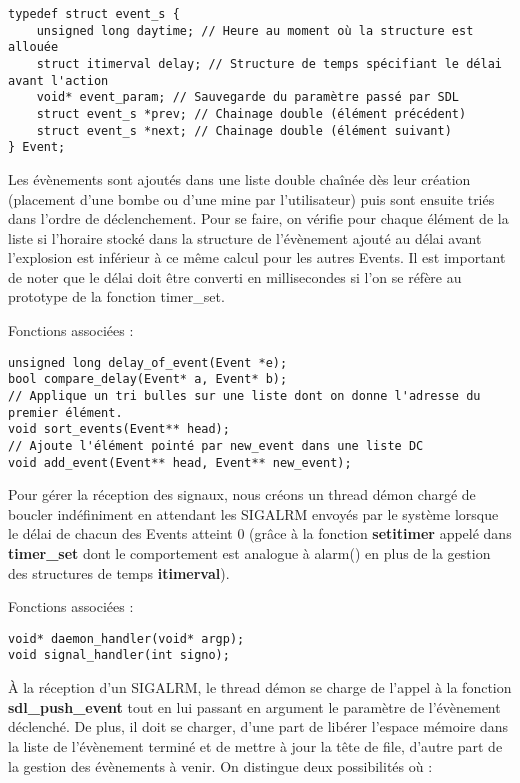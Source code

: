 \documentclass[a4paper]{article}
\begin{document}
\begin{verbatim}
typedef struct event_s {
    unsigned long daytime; // Heure au moment où la structure est allouée
    struct itimerval delay; // Structure de temps spécifiant le délai avant l'action
    void* event_param; // Sauvegarde du paramètre passé par SDL
    struct event_s *prev; // Chainage double (élément précédent)
    struct event_s *next; // Chainage double (élément suivant)
} Event;
\end{verbatim}

Les évènements sont ajoutés dans une liste double chaînée dès leur création (placement d'une bombe ou d'une mine par l'utilisateur) puis sont ensuite triés dans l'ordre de déclenchement. Pour se faire, on vérifie pour chaque élément de la liste si l'horaire stocké dans la structure de l'évènement ajouté au délai avant l'explosion est inférieur à ce même calcul pour les autres Events. Il est important de noter que le délai doit être converti en millisecondes si l'on se réfère au prototype de la fonction timer\_set.

Fonctions associées :
\begin{verbatim}
unsigned long delay_of_event(Event *e);
bool compare_delay(Event* a, Event* b);
// Applique un tri bulles sur une liste dont on donne l'adresse du premier élément.
void sort_events(Event** head);
// Ajoute l'élément pointé par new_event dans une liste DC 
void add_event(Event** head, Event** new_event);
\end{verbatim}

Pour gérer la réception des signaux, nous créons un thread démon chargé de boucler indéfiniment en attendant les SIGALRM envoyés par le système lorsque le délai de chacun des Events atteint 0 (grâce à la fonction \textbf{setitimer} appelé dans \textbf{timer\_set} dont le comportement est analogue à alarm() en plus de la gestion des structures de temps \textbf{itimerval}).

Fonctions associées :
\begin{verbatim}
void* daemon_handler(void* argp);
void signal_handler(int signo);
\end{verbatim}

À la réception d'un SIGALRM, le thread démon se charge de l'appel à la fonction \textbf{sdl\_push\_event} tout en lui passant en argument le paramètre de l'évènement déclenché. De plus, il doit se charger, d'une part de libérer l'espace mémoire dans la liste de l'évènement terminé et de mettre à jour la tête de file, d'autre part de la gestion des évènements à venir. On distingue deux possibilités où : 
\end{document}
